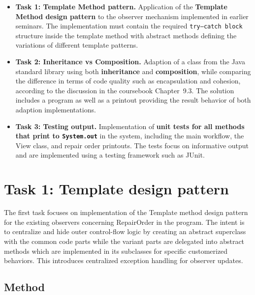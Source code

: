 \documentclass[a4paper]{scrartcl}
\begin{document}
\begin{itemize}
    \item \textbf{Task 1: Template Method pattern.} Application of the \textbf{Template Method design pattern} to the observer mechanism implemented in earlier seminars. The implementation must contain the required \texttt{try--catch block} structure inside the template method with abstract methods defining the variations of different template patterns.

    \item \textbf{Task 2: Inheritance vs Composition.} Adaption of a class from the Java standard library using both \textbf{inheritance} and \textbf{composition}, while comparing the difference in terms of code quality such as encapsulation and cohesion, according to the discussion in the coursebook Chapter~9.3. The solution includes a program as well as a printout providing the result behavior of both adaption implementations.

    \item \textbf{Task 3: Testing output.} Implementation of \textbf{unit tests for all methods that print to \texttt{System.out}} in the system, including the main workflow, the View class, and repair order printouts. The tests focus on informative output and are implemented using a testing framework such as JUnit.

\end{itemize}

\section{Task 1: Template design pattern}
The first task focuses on implementation of the Template method design pattern for the existing observers concerning RepairOrder in the program. The intent is to centralize and hide outer control-flow logic by creating an abstract superclass with the common code parts while the variant parts are delegated into abstract methods which are implemented in its subclasses for specific customerized behaviors. This introduces centralized exception handling for observer updates. 

\subsection{Method}
\end{document}
